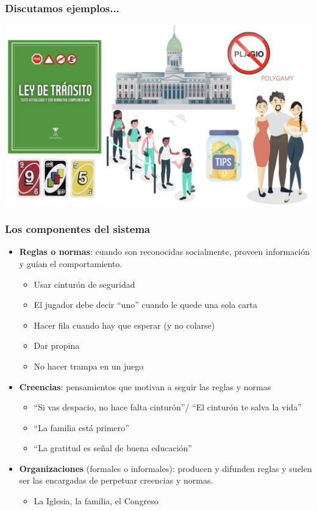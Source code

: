 \documentclass{beamer}
\begin{document}
\begin{frame}
    \frametitle{Discutamos ejemplos...}
    \centering
    \includegraphics[scale=0.55]{../Figures/M9.1.jpg}
\end{frame}

\begin{frame}
    \frametitle{Los componentes del sistema}
    \begin{itemize}
        \item \textbf{Reglas o normas}: cuando son reconocidas socialmente, proveen información y guían el comportamiento.
            \begin{itemize}
            \item Usar cinturón de seguridad
            \item El jugador debe decir “uno” cuando le quede una sola carta 
            \item Hacer fila cuando hay que esperar (y no colarse) 
            \item Dar propina
            \item No hacer trampa en un juego
            \end{itemize}
        \item \textbf{Creencias}: pensamientos que motivan a seguir las reglas y normas
            \begin{itemize}
            \item “Si vas despacio, no hace falta cinturón”/ “El cinturón te salva la vida”
            \item “La familia está primero”
            \item  “La gratitud es señal de buena educación” \vspace{1mm}
            \end{itemize}
        \item \textbf{Organizaciones} (formales o informales): producen y difunden reglas y suelen ser las encargadas de perpetuar creencias y normas. 
            \begin{itemize}
            \item La Iglesia, la familia, el Congreso
            \end{itemize}
    \end{itemize}
\end{frame}
\end{document}
